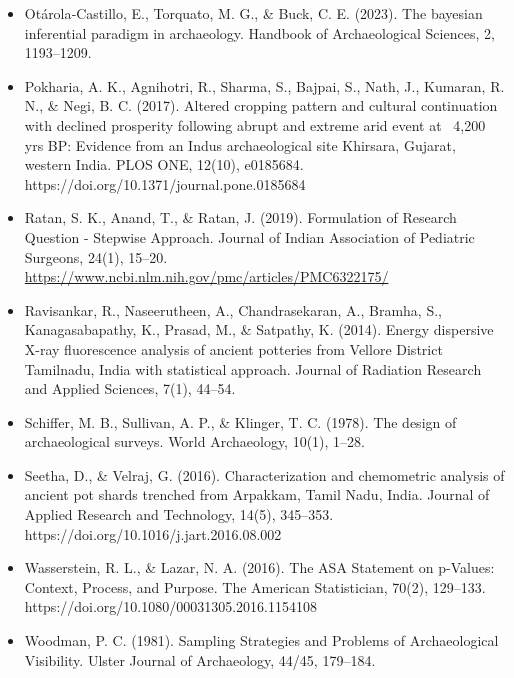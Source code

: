 \documentclass{article}
\begin{document}
\begin{itemize}
    \item Otárola‐Castillo, E., Torquato, M. G., \& Buck, C. E. (2023). The bayesian inferential paradigm in archaeology. Handbook of Archaeological Sciences, 2, 1193–1209.
    \item Pokharia, A. K., Agnihotri, R., Sharma, S., Bajpai, S., Nath, J., Kumaran, R. N., \& Negi, B. C. (2017). Altered cropping pattern and cultural continuation with declined prosperity following abrupt and extreme arid event at ~4,200 yrs BP: Evidence from an Indus archaeological site Khirsara, Gujarat, western India. PLOS ONE, 12(10), e0185684. https://doi.org/10.1371/journal.pone.0185684
    \item Ratan, S. K., Anand, T., \& Ratan, J. (2019). Formulation of Research Question - Stepwise Approach. Journal of Indian Association of Pediatric Surgeons, 24(1), 15–20. \\
    \href{https://www.ncbi.nlm.nih.gov/pmc/articles/PMC6322175/}{https://www.ncbi.nlm.nih.gov/pmc/articles/PMC6322175/}
    \item Ravisankar, R., Naseerutheen, A., Chandrasekaran, A., Bramha, S., Kanagasabapathy, K., Prasad, M., \& Satpathy, K. (2014). Energy dispersive X-ray fluorescence analysis of ancient potteries from Vellore District Tamilnadu, India with statistical approach. Journal of Radiation Research and Applied Sciences, 7(1), 44–54.
    \item Schiffer, M. B., Sullivan, A. P., \& Klinger, T. C. (1978). The design of archaeological surveys. World Archaeology, 10(1), 1–28.
    \item Seetha, D., \& Velraj, G. (2016). Characterization and chemometric analysis of ancient pot shards trenched from Arpakkam, Tamil Nadu, India. Journal of Applied Research and Technology, 14(5), 345–353. \\
    https://doi.org/10.1016/j.jart.2016.08.002
    \item Wasserstein, R. L., \& Lazar, N. A. (2016). The ASA Statement on p-Values: Context, Process, and Purpose. The American Statistician, 70(2), 129–133. \\
    https://doi.org/10.1080/00031305.2016.1154108
    \item Woodman, P. C. (1981). Sampling Strategies and Problems of Archaeological Visibility. Ulster Journal of Archaeology, 44/45, 179–184.
\end{itemize}
\end{document}
